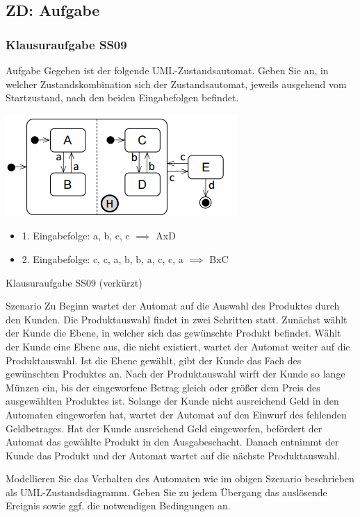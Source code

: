 \documentclass[18pt]{beamer}
\begin{document}
	\subsection{ZD: Aufgabe}
	\begin{frame}
		\frametitle{Klausuraufgabe SS09}
		\begin{block}{Aufgabe}
			Gegeben ist der folgende UML-Zustandsautomat. Geben Sie an, in welcher Zustandskombination
			sich der Zustandsautomat, jeweils ausgehend vom Startzustand, nach den beiden Eingabefolgen
			befindet.
		\end{block}
		\centering
		\includegraphics[scale=0.7]{./pics/tut2/auto_ex.png}
		\begin{itemize}
			\item 1. Eingabefolge: a, b, c, c \pause $\implies$ AxD
			\item 2. Eingabefolge: c, c, a, b, b, a, c, c, a \pause $\implies$ BxC
		\end{itemize}
	\end{frame}

	\begin{frame}{Klausuraufgabe SS09 (verkürzt)}
	\begin{block}{Szenario}
	\small	Zu Beginn wartet der Automat auf die Auswahl des Produktes durch den Kunden. Die
		Produktauswahl findet in zwei Schritten statt. Zunächst wählt der Kunde die Ebene, in
		welcher sich das gewünschte Produkt befindet. Wählt der Kunde eine Ebene aus, die
		nicht existiert, wartet der Automat weiter auf die Produktauswahl. Ist die Ebene gewählt,
		gibt der Kunde das Fach des gewünschten Produktes an. Nach der Produktauswahl wirft der Kunde so lange
		Münzen ein, bis der eingeworfene Betrag gleich oder größer dem Preis des ausgewählten
		Produktes ist. Solange der Kunde nicht ausreichend Geld in den Automaten eingeworfen
		hat, wartet der Automat auf den Einwurf des fehlenden Geldbetrages. Hat der
		Kunde ausreichend Geld eingeworfen, befördert der Automat das gewählte Produkt in
		den Ausgabeschacht. Danach entnimmt der Kunde das Produkt und der Automat wartet auf die nächste Produktauswahl.
	\end{block}
		Modellieren Sie das Verhalten des Automaten wie im obigen Szenario beschrieben als UML-Zustandsdiagramm.
		Geben Sie zu jedem Übergang das auslösende Ereignis sowie ggf. die
		notwendigen Bedingungen an.
\end{frame}
		
\end{document}
